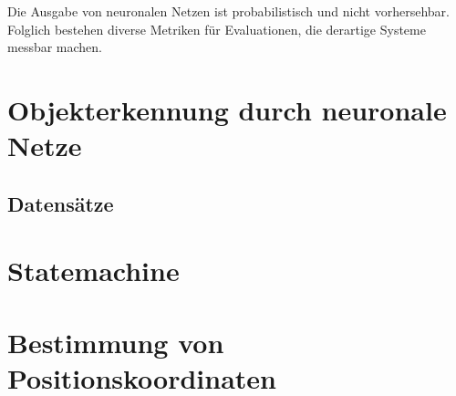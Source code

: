 			Die Ausgabe von neuronalen Netzen ist probabilistisch und nicht vorhersehbar. Folglich bestehen diverse Metriken für Evaluationen, die derartige Systeme messbar machen.  
		
	\section{Objekterkennung durch neuronale Netze}
	\label{sec: Mecanumräder}
		
		\subsection{Datensätze}
		
	

			
	\section{Statemachine}
	\label{sec: Regelung}
	
	
		
		
	\section{Bestimmung von Positionskoordinaten}
	
	

